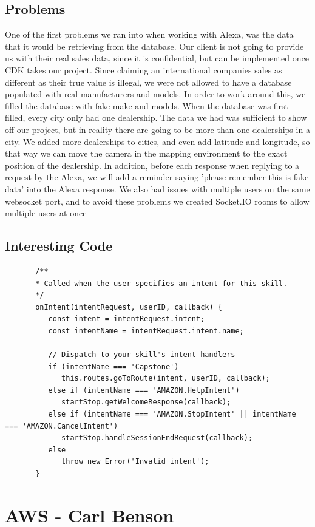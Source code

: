 \documentclass[onecolumn, draftclsnofoot,10pt, compsoc]{IEEEtran}
\begin{document}
    \subsection{Problems}
    One of the first problems we ran into when working with Alexa, was the data that it would be retrieving from the database. Our client is not going to provide us with their real sales data, since it is confidential, but can be implemented once CDK takes our project. Since claiming an international companies sales as different as their true value is illegal, we were not allowed to have a database populated with real manufacturers and models. In order to work around this, we filled the database with fake make and models. When the database was first filled, every city only had one dealership. The data we had was sufficient to show off our project, but in reality there are going to be more than one dealerships in a city. We added more dealerships to cities, and even add latitude and longitude, so that way we can move the camera in the mapping environment to the exact position of the dealership. In addition, before each response when replying to a request by the Alexa, we will add a reminder saying 'please remember this is fake data' into the Alexa response. We also had issues with multiple users on the same websocket port, and to avoid these problems we created Socket.IO rooms to allow multiple users at once
    \subsection{Interesting Code}

    \begin{lstlisting}
       /**
       * Called when the user specifies an intent for this skill.
       */
       onIntent(intentRequest, userID, callback) {
          const intent = intentRequest.intent;
          const intentName = intentRequest.intent.name;

          // Dispatch to your skill's intent handlers
          if (intentName === 'Capstone')
             this.routes.goToRoute(intent, userID, callback);
          else if (intentName === 'AMAZON.HelpIntent')
             startStop.getWelcomeResponse(callback);
          else if (intentName === 'AMAZON.StopIntent' || intentName === 'AMAZON.CancelIntent')
             startStop.handleSessionEndRequest(callback);
          else
             throw new Error('Invalid intent');
       }
        \end{lstlisting}

\section{AWS - Carl Benson}
\end{document}
